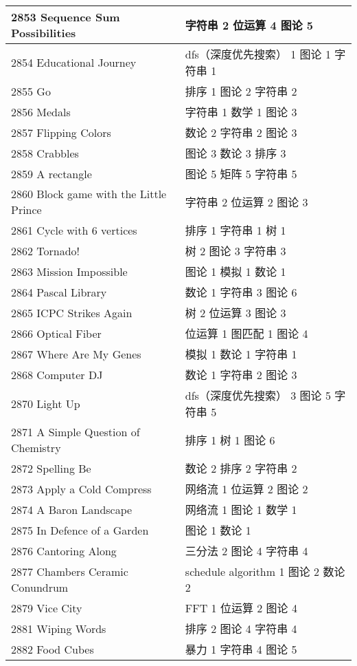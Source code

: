 \begin{longtable}{| p{} | p{} |}
 2853 Sequence Sum Possibilities  & 字符串 2 位运算 4 图论 5 \\ \hline
 2854 Educational Journey  & dfs（深度优先搜索） 1 图论 1 字符串 1 \\ \hline
 2855 Go  & 排序 1 图论 2 字符串 2 \\ \hline
 2856 Medals  & 字符串 1 数学 1 图论 3 \\ \hline
 2857 Flipping Colors  & 数论 2 字符串 2 图论 3 \\ \hline
 2858 Crabbles  & 图论 3 数论 3 排序 3 \\ \hline
 2859 A rectangle  & 图论 5 矩阵 5 字符串 5 \\ \hline
 2860 Block game with the Little Prince  & 字符串 2 位运算 2 图论 3 \\ \hline
 2861 Cycle with 6 vertices  & 排序 1 字符串 1 树 1 \\ \hline
 2862 Tornado!  & 树 2 图论 3 字符串 3 \\ \hline
 2863 Mission Impossible  & 图论 1 模拟 1 数论 1 \\ \hline
 2864 Pascal Library  & 数论 1 字符串 3 图论 6 \\ \hline
 2865 ICPC Strikes Again  & 树 2 位运算 3 图论 3 \\ \hline
 2866 Optical Fiber  & 位运算 1 图匹配 1 图论 4 \\ \hline
 2867 Where Are My Genes  & 模拟 1 数论 1 字符串 1 \\ \hline
 2868 Computer DJ  & 数论 1 字符串 2 图论 3 \\ \hline
 2870 Light Up  & dfs（深度优先搜索） 3 图论 5 字符串 5 \\ \hline
 2871 A Simple Question of Chemistry  & 排序 1 树 1 图论 6 \\ \hline
 2872 Spelling Be  & 数论 2 排序 2 字符串 2 \\ \hline
 2873 Apply a Cold Compress  & 网络流 1 位运算 2 图论 2 \\ \hline
 2874 A Baron Landscape  & 网络流 1 图论 1 数学 1 \\ \hline
 2875 In Defence of a Garden  & 图论 1 数论 1 \\ \hline
 2876 Cantoring Along  & 三分法 2 图论 4 字符串 4 \\ \hline
 2877 Chambers Ceramic Conundrum  & schedule algorithm 1 图论 2 数论 2 \\ \hline
 2879 Vice City  & FFT 1 位运算 2 图论 4 \\ \hline
 2881 Wiping Words  & 排序 2 图论 4 字符串 4 \\ \hline
 2882 Food Cubes  & 暴力 1 字符串 4 图论 5 \\ \hline

\end{longtable}
